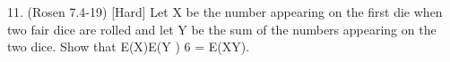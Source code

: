 \item
11. (Rosen 7.4-19) [Hard] Let X be the number appearing on the first die when two fair dice are rolled
and let Y be the sum of the numbers appearing on the two dice. Show that E(X)E(Y ) 6 = E(XY).


